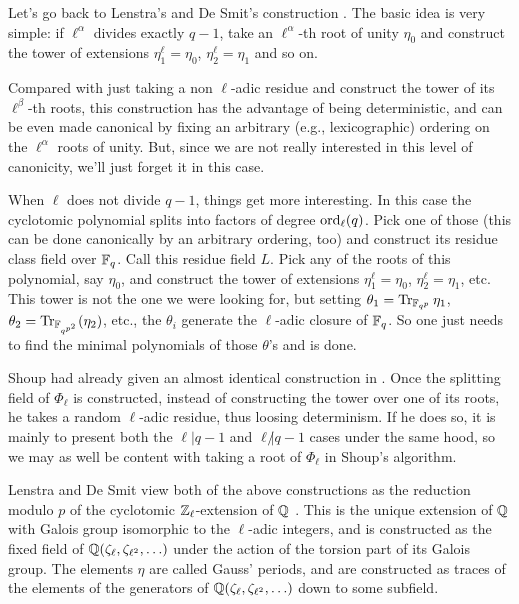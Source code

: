 \documentclass[11pt]{article}
\begin{document}
Let's go back to Lenstra's and De Smit's construction
\cite{lenstra+desmit08-stdmodels}. The basic idea is very simple: if
$\ell^\alpha$ divides exactly $q-1$, take an $\ell^\alpha$-th root of
unity $\eta_0$ and construct the tower of extensions
$\eta_1^\ell=\eta_0$, $\eta_2^\ell=\eta_1$ and so on.

Compared with just taking a non $\ell$-adic residue and construct the
tower of its $\ell^\beta$-th roots, this construction has the
advantage of being deterministic, and can be even made canonical by
fixing an arbitrary (e.g., lexicographic) ordering on the
$\ell^\alpha$ roots of unity. But, since we are not really interested
in this level of canonicity, we'll just forget it in this case.

When $\ell$ does not divide $q-1$, things get more interesting. In
this case the cyclotomic polynomial splits into factors of degree
$\operatorname{ord}_\ell(q)$. Pick one of those (this can be done canonically by an
arbitrary ordering, too) and construct its residue class field over
$\mathbb{F}_q$. Call this residue field $L$. Pick any of the roots of this
polynomial, say $\eta_0$, and construct the tower of extensions
$\eta_1^\ell=\eta_0$, $\eta_2^\ell=\eta_1$, etc. This tower is not the
one we were looking for, but setting $\theta_1 =
\operatorname{Tr}_{\mathbb{F}_{q^p}}\eta_1$, $\theta_2 = \operatorname{Tr}_{\mathbb{F}_{q^{p^2}}}(\eta_2)$, etc.,
the $\theta_i$ generate the $\ell$-adic closure of $\mathbb{F}_q$. So one just
needs to find the minimal polynomials of those $\theta$'s and is done.

Shoup had already given an almost identical construction in
\cite{shoup94}. Once the splitting field of $\Phi_\ell$ is
constructed, instead of constructing the tower over one of its roots,
he takes a random $\ell$-adic residue, thus loosing determinism. If he
does so, it is mainly to present both the $\ell|q-1$ and
$\ell\not|q-1$ cases under the same hood, so we may as well be content
with taking a root of $\Phi_\ell$ in Shoup's algorithm.

Lenstra and De Smit view both of the above constructions as the
reduction modulo $p$ of the cyclotomic $\mathbb{Z}_\ell$-extension of $\mathbb{Q}$
\cite{lang1990cyclotomic,washington1997introduction}. This is the
unique extension of $\mathbb{Q}$ with Galois group isomorphic to the
$\ell$-adic integers, and is constructed as the fixed field of
$\mathbb{Q}(\zeta_\ell, \zeta_{\ell^2}, \ldots)$ under the action of the
torsion part of its Galois group. The elements $\eta$ are called
Gauss' periods, and are constructed as traces of the elements of the
generators of $\mathbb{Q}(\zeta_\ell, \zeta_{\ell^2}, \ldots)$ down to some
subfield.
\end{document}

